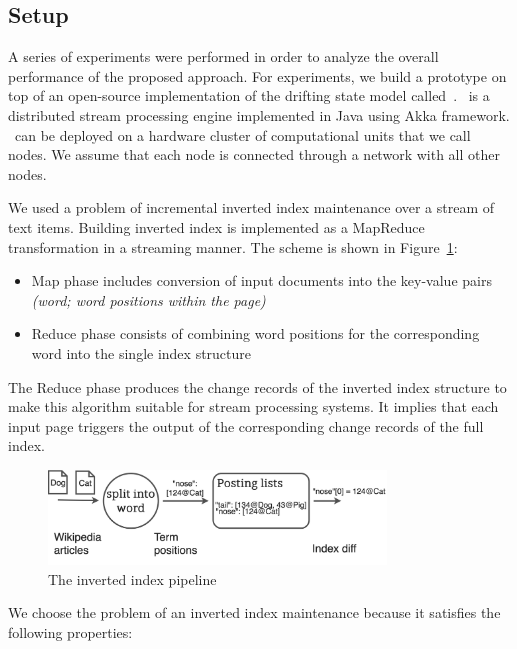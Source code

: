 
\subsection{Setup}
A series of experiments were performed in order to analyze the overall performance of the proposed approach. For experiments, we build a prototype on top of an open-source implementation of the drifting state model called~\FlameStream. \FlameStream\ is a distributed stream processing engine implemented in Java using Akka framework. \FlameStream\ can be deployed on a hardware cluster of computational units that we call nodes. We assume that each node is connected through a network with all other nodes.

We used a problem of incremental inverted index maintenance over a stream of text items. 
Building inverted index is implemented as a MapReduce transformation in a streaming manner. The scheme is shown in Figure~\ref{index}: 

\begin{itemize}
    \item Map phase includes conversion of input documents into the key-value pairs {\it (word; word positions within the page)}
    \item Reduce phase consists of combining word positions for the corresponding word into the single index structure 
\end{itemize}

The Reduce phase produces the change records of the inverted index structure to make this algorithm suitable for stream processing systems. It implies that each input page triggers the output of the corresponding change records of the full index.

\begin{figure}[t]
  \centering
  \includegraphics[width=0.80\textwidth]{Chapters/DeterministicModelRuntime/pics/index}
  \caption{The inverted index pipeline}
  \label {index}
\end{figure}

We choose the problem  of  an inverted index maintenance  because it satisfies the following properties:

